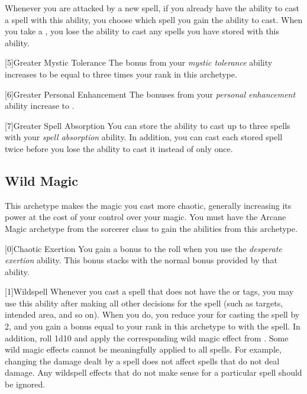         Whenever you are attacked by a new spell, if you already have the ability to cast a spell with this ability, you choose which spell you gain the ability to cast.
        When you take a , you lose the ability to cast any spells you have stored with this ability.

        [5]{Greater Mystic Tolerance} The bonus from your \textit{mystic tolerance} ability increases to be equal to three times your rank in this archetype.

        [6]{Greater Personal Enhancement} The bonuses from your \textit{personal enhancement} ability increase to .

        [7]{Greater Spell Absorption} You can store the ability to cast up to three spells with your \textit{spell absorption} ability.
        In addition, you can cast each stored spell twice before you lose the ability to cast it instead of only once.

    \newpage
    \subsection{Wild Magic}
        This archetype makes the magic you cast more chaotic, generally increasing its power at the cost of your control over your magic.
        You must have the Arcane Magic archetype from the sorcerer class to gain the abilities from this archetype.

        [0]{Chaotic Exertion} You gain a  bonus to the roll when you use the \textit{desperate exertion} ability.
        This bonus stacks with the normal  bonus provided by that ability.

        [1]{Wildspell} Whenever you cast a spell that does not have the  or  tags, you may use this ability after making all other decisions for the spell (such as targets, intended area, and so on).
        When you do, you reduce your  for casting the spell by 2, and you gain a bonus equal to your rank in this archetype to  with the spell.
        In addition, roll 1d10 and apply the corresponding wild magic effect from .
        Some wild magic effects cannot be meaningfully applied to all spells.
        For example, changing the damage dealt by a spell does not affect spells that do not deal damage.
        Any wildspell effects that do not make sense for a particular spell should be ignored.

